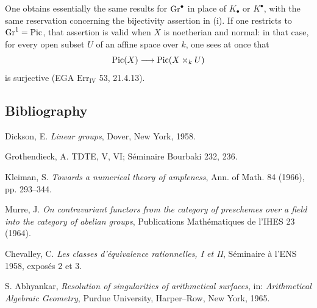 One obtains essentially the same results for $\operatorname{Gr}^\bullet$ in place of
$K_\bullet$ or $K^\bullet$, with the same reservation concerning the
bijectivity assertion in (i). If one restricts to $\operatorname{Gr}^1=\operatorname{Pic}$, that
assertion is valid when $X$ is noetherian and normal: in that case, for every
open subset $U$ of an affine space over $k$, one sees at once that
\[
\operatorname{Pic}(X)\longrightarrow\operatorname{Pic}(X\times_k U)
\]
is surjective (EGA $\mathrm{Err}_{\mathrm{IV}}$ 53, 21.4.13).

\subsection*{Bibliography}
\begin{enumerate}[label={[\arabic*]}]
\item Dickson, E. \emph{Linear groups}, Dover, New York, 1958.
\item Grothendieck, A. TDTE, V, VI; S\'eminaire Bourbaki 232, 236.
\item Kleiman, S. \emph{Towards a numerical theory of ampleness}, Ann. of
  Math. 84 (1966), pp. 293--344.
\item Murre, J. \emph{On contravariant functors from the category of
  preschemes over a field into the category of abelian groups}, Publications
  Math\'ematiques de l'IHES 23 (1964).
\item Chevalley, C. \emph{Les classes d'\'equivalence rationnelles, I et II},
  S\'eminaire \`a l'ENS 1958, expos\'es 2 et 3.
\item S. Abhyankar, \emph{Resolution of singularities of arithmetical
  surfaces}, in: \emph{Arithmetical Algebraic Geometry}, Purdue University,
  Harper--Row, New York, 1965.
\end{enumerate}
